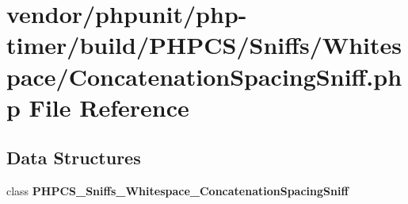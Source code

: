 \section{vendor/phpunit/php-\/timer/build/\+P\+H\+P\+C\+S/\+Sniffs/\+Whitespace/\+Concatenation\+Spacing\+Sniff.php File Reference}
\label{php-timer_2build_2_p_h_p_c_s_2_sniffs_2_whitespace_2_concatenation_spacing_sniff_8php}
\subsection*{Data Structures}
\begin{DoxyCompactItemize}
\item 
class {\bf P\+H\+P\+C\+S\+\_\+\+Sniffs\+\_\+\+Whitespace\+\_\+\+Concatenation\+Spacing\+Sniff}
\end{DoxyCompactItemize}
